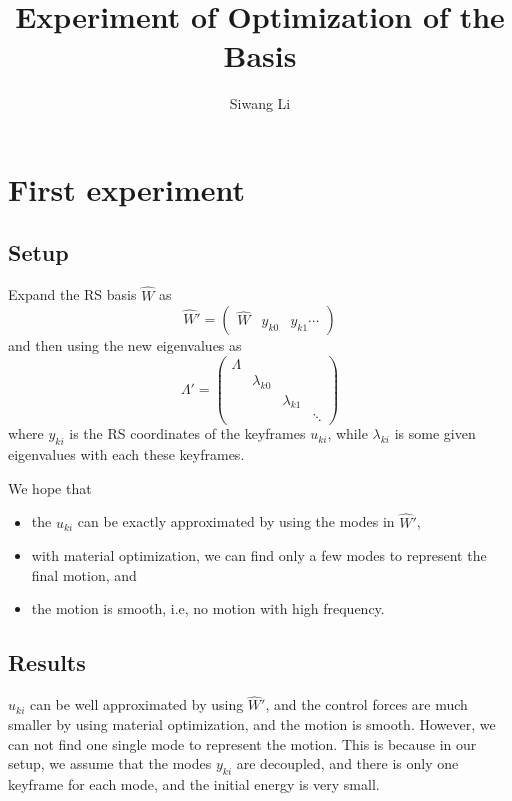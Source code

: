 \documentclass[9pt,twocolumn]{extarticle}
\author{Siwang Li}
\title{Experiment of Optimization of the Basis}
\begin{document}
\maketitle

\setlength{\parskip}{0.5ex}

\section{First experiment}
\subsection{Setup}
Expand the RS basis $\hat{W}$ as
\begin{equation} \label{w}
  \hat{W}' = \left( \begin{array}{ccc}
      \hat{W} & y_{k0} &y_{k1} \cdots
    \end{array} \right)
\end{equation}
and then using the new eigenvalues as
\begin{equation} \label{e}
  \Lambda' = \left( \begin{array}{cccc}
      \Lambda &\\
      &\lambda_{k0}&\\
      &&\lambda_{k1}&\\
      &&&\ddots
    \end{array} \right)
\end{equation}
where $y_{ki}$ is the RS coordinates of the keyframes $u_{ki}$, while
$\lambda_{ki}$ is some given eigenvalues with each these keyframes.

We hope that 
\begin{itemize}
\item the $u_{ki}$ can be exactly approximated by using the modes in $\hat{W}'$,
\item with material optimization, we can find only a few modes to represent the
  final motion, and
\item the motion is smooth, i.e, no motion with high frequency.
\end{itemize}

\subsection{Results}
$u_{ki}$ can be well approximated by using $\hat{W}'$, and the control forces
are much smaller by using material optimization, and the motion is
smooth. However, we can not find one single mode to represent the motion. This
is because in our setup, we assume that the modes $y_{ki}$ are decoupled, and
there is only one keyframe for each mode, and the initial energy is very small.
\end{document}
